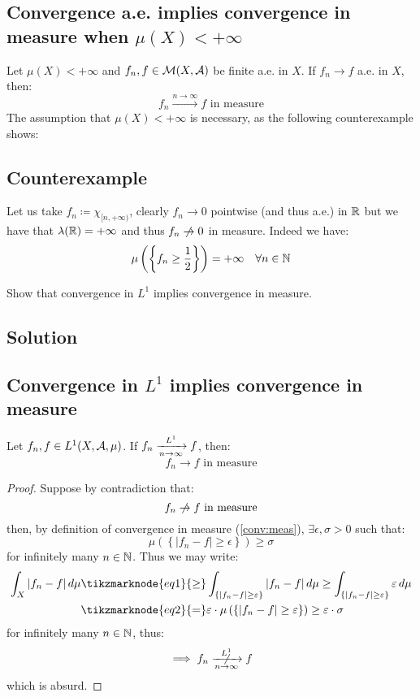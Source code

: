 \subsection{Convergence a.e. implies convergence in measure when \texorpdfstring{$\mu(X)<+\infty$}{ the measure of X is finite}}
Let $\mu(X)<+\infty$ and $f_n,f \in \mathcal{M}(X,\mathcal{A})$ be finite a.e. in $X$. If $f_n \to f$ a.e. in $X$, then:
\[
    f_n \xrightarrow{n\to\infty} f \text{ in measure}    
\]
The assumption that $\mu(X)<+\infty$ is necessary, as the following counterexample shows:

\subsection{Counterexample}
Let us take $f_n \coloneqq \chi_{[n,+\infty)}$, clearly $f_n \to 0$ pointwise (and thus a.e.) in $\mathbb{R}$ but we have that $\lambda(\mathbb{R})=+\infty$ and thus $f_n \centernot\to 0$ in measure. Indeed we have:
\[
    \mu \left( \left\{ f_n \geq \frac{1}{2} \right\} \right) = +\infty \quad \forall n \in \mathbb{N} 
\]


\question
Show that convergence in $L^1$ implies convergence in measure.

\subsection*{Solution}

\subsection{Convergence in \texorpdfstring{$L^1$}{L1} implies convergence in measure} \label{L1->measure}
Let $f_n,f \in L^1(X,\mathcal{A},\mu)$. If $f_n \xrightarrow[n\to\infty]{L^1} f$, then:
\[
    f_n \to f \text{ in measure}    
\]

\begin{proof}
    Suppose by contradiction that:
    \[
        f_n \centernot \to f \text{ in measure}    
    \]
    then, by definition of convergence in measure (\ref{conv:meas}), $\exists \epsilon, \sigma > 0$ such that:
    \[
         \mu \left( \left\{ |f_n-f| \geq \epsilon \right\} \right) \geq \sigma
    \]
    for infinitely many $n\in\mathbb{N}$. Thus we may write:
    \begin{align*}
        \int_X |f_n-f| \, d\mu & \tikzmarknode{eq1}{\geq} \int_{ \{ |f_n-f| \geq \epsilon \} } |f_n-f| \, d\mu \geq \int_{ \{ |f_n-f| \geq \epsilon \} } \epsilon \, d\mu  \\
        & \tikzmarknode{eq2}{=} \epsilon \cdot \mu \left( \left\{ |f_n-f| \geq \epsilon \right\} \right) \geq \epsilon \cdot \sigma
    \end{align*} 
    for infinitely many $n\in\mathbb{N}$, thus:
    \[
        \implies f_n \centernot{\toin{L^1}} f    
    \]
    which is absurd.
\end{proof}

